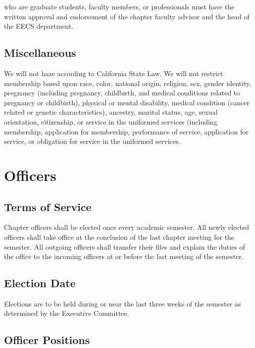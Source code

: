 \documentclass[11pt]{article}
\begin{document}
who are graduate students, faculty members, or professionals must have the written approval and endorsement of the chapter faculty advisor and the head of the EECS department.

\subsection{Miscellaneous}
\label{sec:org70cfe80}

We will not haze according to California State Law.
We will not restrict membership based upon race, color, national origin, religion, sex, gender identity, pregnancy (including pregnancy, childbirth, and medical conditions related to pregnancy or childbirth), physical or mental disability, medical condition (cancer related or genetic characteristics), ancestry, marital status, age, sexual orientation, citizenship, or service in the uniformed services (including membership, application for membership, performance of service, application for service, or obligation for service in the uniformed services.
\section{Officers}
\label{sec:orgdb594ba}

\subsection{Terms of Service}
\label{sec:orgb14503e}

Chapter officers shall be elected once every academic semester.
All newly elected officers shall take office at the conclusion of the last chapter meeting for the semester.
All outgoing officers shall transfer their files and explain the duties of the office to the incoming officers at or before the last meeting of the semester.

\subsection{Election Date}
\label{sec:orgecc0aa5}

Elections are to be held during or near the last three weeks of the semester as determined by the Executive Committee.

\subsection{Officer Positions}
\label{sec:org13a76c9}
\end{document}
